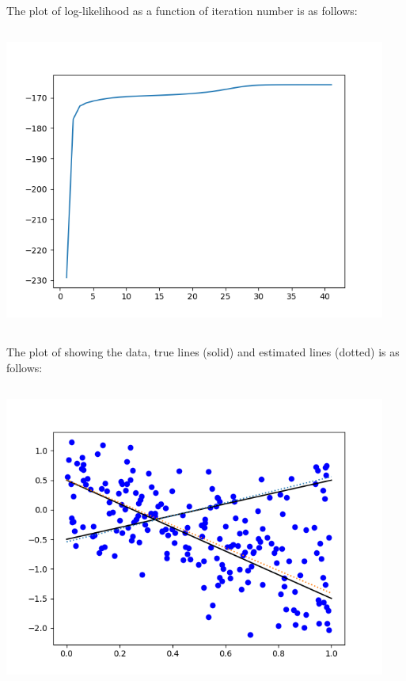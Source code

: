 \documentclass[letterpaper,11pt]{article}
\begin{document}
\begin{spacing}{1.2}
The plot of log-likelihood as a function of iteration number is as follows:

\includegraphics[width=4.95in,height=3.95in]{loglikelihood.png}

The plot of showing the data, true lines (solid) and estimated lines (dotted) is as follows:

\includegraphics[width=4.95in,height=3.95in]{data_line.png}
\end{spacing}
\end{document}
